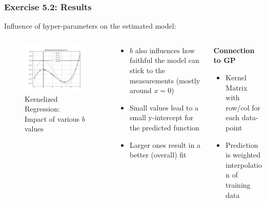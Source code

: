\documentclass[10pt,aspectratio=169,handout]{beamer}
\begin{document}
\begin{frame}
    \frametitle{Exercise 5.2: Results}

    Influence of hyper-parameters on the estimated model: 
    \begin{columns}
    \begin{column}{0.36\textwidth}
        \begin{figure}
            \centering
            \includegraphics[width=1.1\textwidth]{images/task-5-2-b.png}
            \caption{\scriptsize Kernelized Regression:\\Impact of various $b$ values}
        \end{figure}
    \end{column}


    \begin{column}{0.33\textwidth}
        \begin{itemize}
            \item $b$ also influences how faithful the model can stick to the measurements (mostly around $x = 0$)
            \item Small values lead to a small y-intercept for the predicted function
            \item Larger ones result in a better (overall) fit
        \end{itemize}
    \end{column}

    \begin{column}{0.33\textwidth}
        \textbf{Connection to GP}
        \begin{itemize}
            \item Kernel Matrix with row/col for each data-point
            \item Prediction is weighted interpolation of training data
        \end{itemize}
    \end{column}
    \end{columns}
\end{frame}
\end{document}
